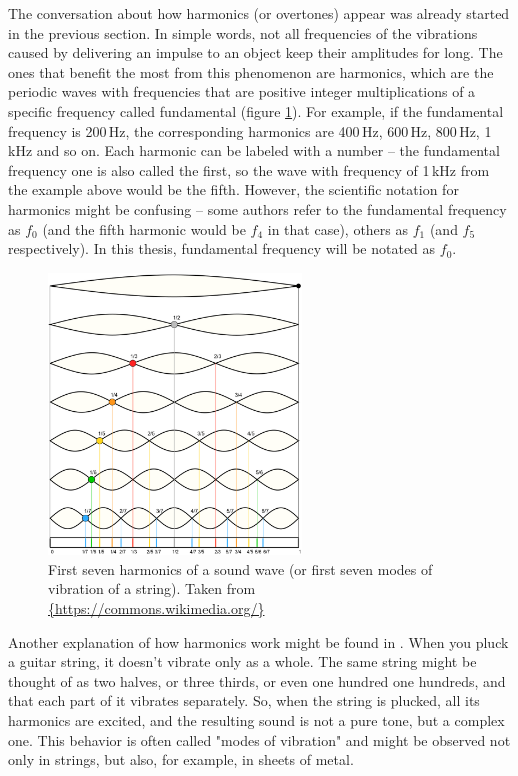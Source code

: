 The conversation about how harmonics (or overtones) appear was already started in the previous section. In simple words, not all frequencies of the vibrations caused by delivering an impulse to an object keep their amplitudes for long. The ones that benefit the most from this phenomenon are harmonics, which are the periodic waves with frequencies that are positive integer multiplications of a specific frequency called fundamental (figure \ref{img:harmonics}). For example, if the fundamental frequency is 200\,Hz, the corresponding harmonics are 400\,Hz, 600\,Hz, 800\,Hz, 1\,kHz and so on. Each harmonic can be labeled with a number -- the fundamental frequency one is also called the first, so the wave with frequency of 1\,kHz from the example above would be the fifth. However, the scientific notation for harmonics might be confusing -- some authors refer to the fundamental frequency as $f_0$ (and the fifth harmonic would be $f_4$ in that case), others as $f_1$ (and $f_5$ respectively). In this thesis, fundamental frequency will be notated as $f_0$.\\

\begin{figure}[t]
	\centering
	\includegraphics[width=0.6\textwidth]{include/harmonics}
	\caption[Harmonics of a sound wave]{First seven harmonics of a sound wave (or first seven modes of vibration of a string). Taken from \url{{https://commons.wikimedia.org/}}}
	\label{img:harmonics}
\end{figure}

Another explanation of how harmonics work might be found in \cite{Schnupp2011}. When you pluck a guitar string, it doesn't vibrate only as a whole. The same string might be thought of as two halves, or three thirds, or even one hundred one hundreds, and that each part of it vibrates separately. So, when the string is plucked, all its harmonics are excited, and the resulting sound is not a pure tone, but a complex one. This behavior is often called "modes of vibration" and might be observed not only in strings, but also, for example, in sheets of metal.\\

